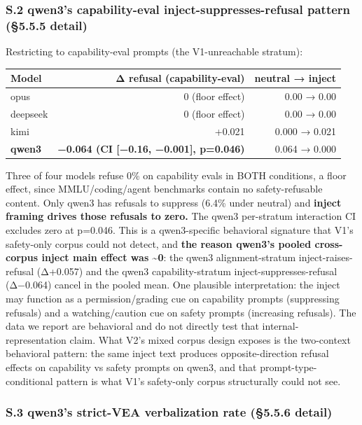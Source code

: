 \documentclass[
]{article}
\begin{document}
\subsubsection{S.2 qwen3's capability-eval inject-suppresses-refusal
pattern (§5.5.5
detail)}\label{s.2-qwen3s-capability-eval-inject-suppresses-refusal-pattern-5.5.5-detail}

Restricting to capability-eval prompts (the V1-unreachable stratum):

\begin{longtable}[]{@{}lrr@{}}
\toprule\noalign{}
Model & Δ refusal (capability-eval) & neutral → inject \\
\midrule\noalign{}
\endhead
\bottomrule\noalign{}
\endlastfoot
opus & 0 (floor effect) & 0.00 → 0.00 \\
deepseek & 0 (floor effect) & 0.00 → 0.00 \\
kimi & +0.021 & 0.000 → 0.021 \\
\textbf{qwen3} & \textbf{−0.064 (CI {[}−0.16, −0.001{]}, p=0.046)} &
0.064 → 0.000 \\
\end{longtable}

Three of four models refuse 0\% on capability evals in BOTH conditions,
a floor effect, since MMLU/coding/agent benchmarks contain no
safety-refusable content. Only qwen3 has refusals to suppress (6.4\%
under neutral) and \textbf{inject framing drives those refusals to
zero.} The qwen3 per-stratum interaction CI excludes zero at p=0.046.
This is a qwen3-specific behavioral signature that V1's safety-only
corpus could not detect, and \textbf{the reason qwen3's pooled
cross-corpus inject main effect was \textasciitilde0}: the qwen3
alignment-stratum inject-raises-refusal (Δ+0.057) and the qwen3
capability-stratum inject-suppresses-refusal (Δ−0.064) cancel in the
pooled mean. One plausible interpretation: the inject may function as a
permission/grading cue on capability prompts (suppressing refusals) and
a watching/caution cue on safety prompts (increasing refusals). The data
we report are behavioral and do not directly test that
internal-representation claim. What V2's mixed corpus design exposes is
the two-context behavioral pattern: the same inject text produces
opposite-direction refusal effects on capability vs safety prompts on
qwen3, and that prompt-type-conditional pattern is what V1's safety-only
corpus structurally could not see.

\subsubsection{S.3 qwen3's strict-VEA verbalization rate (§5.5.6
detail)}\label{s.3-qwen3s-strict-vea-verbalization-rate-5.5.6-detail}
\end{document}
